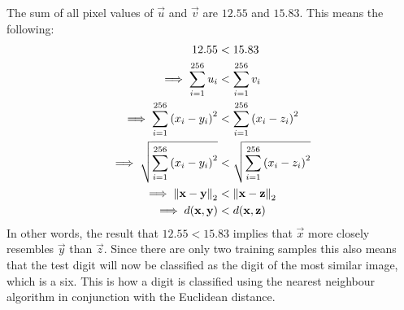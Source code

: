 The sum of all pixel values of \(\vec{u}\) and \(\vec{v}\) are \(12.55\) and \(15.83\).
This means the following:
\begin{align*}
    12.55                                              & < 15.83                                     \\
    \implies \sum_{i = 1}^{256} u_i                    & < \sum_{i = 1}^{256} v_i                    \\
    \implies \sum_{i = 1}^{256} {(x_i - y_i)}^2        & < \sum_{i = 1}^{256} {(x_i - z_i)}^2        \\
    \implies \sqrt{\sum_{i = 1}^{256} {(x_i - y_i)}^2} & < \sqrt{\sum_{i = 1}^{256} {(x_i - z_i)}^2} \\
    \implies \left\lVert\mathbf{x} - \mathbf{y}\right\rVert_2                  & < \left\lVert\mathbf{x} - \mathbf{z}\right\rVert_2                  \\
    \implies d(\mathbf{x}, \mathbf{y})                       & < d(\mathbf{x}, \mathbf{z})
\end{align*}
In other words, the result that \(12.55 < 15.83\) implies that \(\vec{x}\) more closely resembles \(\vec{y}\) than \(\vec{z}\).
Since there are only two training samples this also means that the test digit will now be classified as the digit of the most similar image, which is a six.
This is how a digit is classified using the nearest neighbour algorithm in conjunction with the Euclidean distance.

